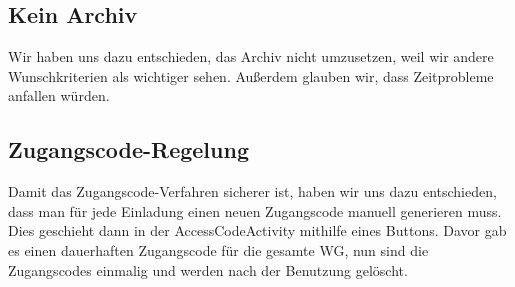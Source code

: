\subsection{Kein Archiv}
Wir haben uns dazu entschieden, das Archiv nicht umzusetzen, weil wir andere Wunschkriterien als wichtiger sehen. Außerdem glauben wir, dass Zeitprobleme anfallen würden.

\subsection{Zugangscode-Regelung}
Damit das Zugangscode-Verfahren sicherer ist, haben wir uns dazu entschieden, dass man für jede Einladung einen neuen Zugangscode manuell generieren muss. Dies geschieht dann in der AccessCodeActivity mithilfe eines Buttons. Davor gab es einen dauerhaften Zugangscode für die gesamte WG, nun sind die Zugangscodes einmalig und werden nach der Benutzung  gelöscht. 
